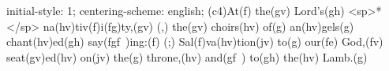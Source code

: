 initial-style: 1;
centering-scheme: english;
(c4)At(f) the(gv) Lord's(gh) <sp>*</sp> na(hv)tiv(f)i(fg)ty,(gv) (,) the(gv) choirs(hv) of(g) an(hv)gels(g) chant(hv)ed(gh) say(fgf~)ing:(f) (;) Sal(f)va(hv)tion(jv) to(g) our(fe) God,(fv) seat(gv)ed(hv) on(jv) the(g) throne,(hv) and(gf~) to(gh) the(hv) Lamb.(g)